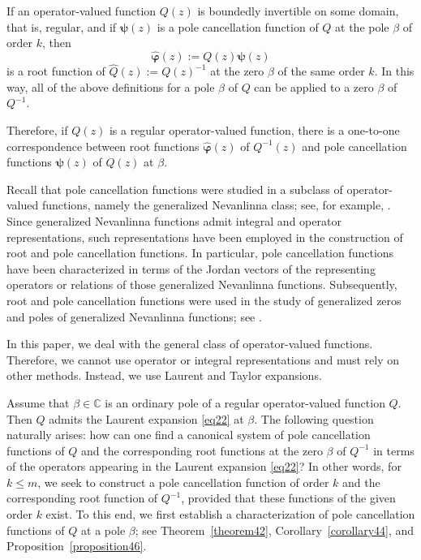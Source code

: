\documentclass[11pt, reqno]{amsart}
\theoremstyle{plain}
\theoremstyle{remark}
\newcounter{str}
\numberwithin{equation}{section}
\begin{document}
If an operator-valued function $Q(z)$ is boundedly invertible on some domain, that is, regular, and if $\boldsymbol{\psi}(z)$ is a pole cancellation function of $Q$ at the pole $\beta$ of order $k$, then
\begin{equation}
\label{eq210}
\boldsymbol{\hat{\varphi}}(z) := Q(z)\boldsymbol{\psi}(z)
\end{equation}
is a root function of $\hat{Q}(z) := Q(z)^{-1}$ at the zero $\beta$ of the same order $k$. In this way, all of the above definitions for a pole $\beta$ of $Q$ can be applied to a zero $\beta$ of $Q^{-1}$.

Therefore, if $Q(z)$ is a regular operator-valued function, there is a one-to-one correspondence between root functions $\boldsymbol{\hat{\varphi}}(z)$ of $Q^{-1}(z)$ and pole cancellation functions $\boldsymbol{\psi}(z)$ of $Q(z)$ at $\beta$.

Recall that pole cancellation functions were studied in a subclass of operator-valued functions, namely the generalized Nevanlinna class; see, for example, \cite{Lu3}. Since generalized Nevanlinna functions admit integral and operator representations, such representations have been employed in the construction of root and pole cancellation functions. In particular, pole cancellation functions have been characterized in terms of the Jordan vectors of the representing operators or relations of those generalized Nevanlinna functions. Subsequently, root and pole cancellation functions were used in the study of generalized zeros and poles of generalized Nevanlinna functions; see \cite{BLu}.

In this paper, we deal with the general class of operator-valued functions. Therefore, we cannot use operator or integral representations and must rely on other methods. Instead, we use Laurent and Taylor expansions.

Assume that $\beta \in \mathbb{C}$ is an ordinary pole of a regular operator-valued function $Q$. Then $Q$ admits the Laurent expansion \eqref{eq22} at $\beta$. The following question naturally arises: how can one find a canonical system of pole cancellation functions of $Q$ and the corresponding root functions at the zero $\beta$ of $Q^{-1}$ in terms of the operators appearing in the Laurent expansion \eqref{eq22}? In other words, for $k \le m$, we seek to construct a pole cancellation function of order $k$ and the corresponding root function of $Q^{-1}$, provided that these functions of the given order $k$ exist. To this end, we first establish a characterization of pole cancellation functions of $Q$ at a pole $\beta$; see Theorem~\ref{theorem42}, Corollary~\ref{corollary44}, and Proposition~\ref{proposition46}.
\end{document}
